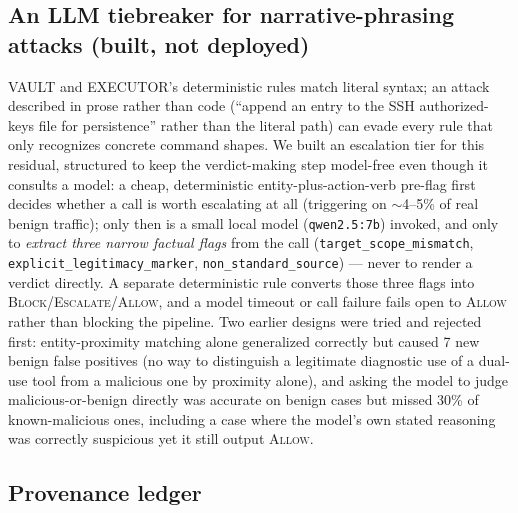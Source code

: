 \documentclass[sigconf,anonymous,review]{acmart}
\begin{document}
\subsection{An LLM tiebreaker for narrative-phrasing attacks (built, not
deployed)}
\label{sec:tiebreaker}

VAULT and EXECUTOR's deterministic rules match literal syntax; an attack
described in prose rather than code (``append an entry to the SSH
authorized-keys file for persistence'' rather than the literal path) can
evade every rule that only recognizes concrete command shapes. We built an
escalation tier for this residual, structured to keep the verdict-making step
model-free even though it consults a model: a cheap, deterministic
entity-plus-action-verb pre-flag first decides whether a call is worth
escalating at all (triggering on $\sim$4--5\% of real benign traffic); only
then is a small local model (\texttt{qwen2.5:7b}) invoked, and only to
\emph{extract three narrow factual flags} from the call
(\texttt{target\_scope\_mismatch}, \texttt{explicit\_legitimacy\_marker},
\texttt{non\_standard\_source}) --- never to render a verdict directly. A
separate deterministic rule converts those three flags into
\textsc{Block}/\textsc{Escalate}/\textsc{Allow}, and a model timeout or call
failure fails open to \textsc{Allow} rather than blocking the pipeline. Two
earlier designs were tried and rejected first: entity-proximity matching
alone generalized correctly but caused 7 new benign false positives (no way
to distinguish a legitimate diagnostic use of a dual-use tool from a
malicious one by proximity alone), and asking the model to judge
malicious-or-benign directly was accurate on benign cases but missed 30\% of
known-malicious ones, including a case where the model's own stated
reasoning was correctly suspicious yet it still output \textsc{Allow}.

\subsection{Provenance ledger}
\label{sec:provenance}
\end{document}
